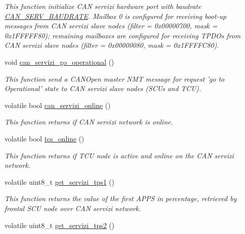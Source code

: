 \begin{DoxyCompactItemize}
\begin{DoxyCompactList}\small\item\em This function initialize C\-A\-N servizi hardware port with baudrate \hyperlink{common_8h_a2a5e84dfc7fa972b75e7ddbc6cc52a45}{C\-A\-N\-\_\-\-S\-E\-R\-V\-\_\-\-B\-A\-U\-D\-R\-A\-T\-E}. Mailbox 0 is configured for receiving boot-\/up messages from C\-A\-N servizi slave nodes (filter = 0x00000700, mask = 0x1\-F\-F\-F\-F\-F80); remaining mailboxes are configured for receiving T\-P\-D\-Os from C\-A\-N servizi slave nodes (filter = 0x00000080, mask = 0x1\-F\-F\-F\-F\-C80). \end{DoxyCompactList}\item 
void \hyperlink{group___c_a_n__servizi__group_gad444fb6be3b439dcfbefff66e85efd94}{can\-\_\-servizi\-\_\-go\-\_\-operational} ()
\begin{DoxyCompactList}\small\item\em This function send a C\-A\-N\-Open master N\-M\-T message for request 'go to Operational' state to C\-A\-N servizi slave nodes (S\-C\-Us and T\-C\-U). \end{DoxyCompactList}\item 
volatile bool \hyperlink{group___c_a_n__servizi__group_ga43e9ef52770f760c5751d83b138c7e6b}{can\-\_\-servizi\-\_\-online} ()
\begin{DoxyCompactList}\small\item\em This function returns if C\-A\-N servizi network is online. \end{DoxyCompactList}\item 
volatile bool \hyperlink{group___c_a_n__servizi__group_ga0c5f72386ae62e3e0b6908efa2fb2b28}{tcs\-\_\-online} ()
\begin{DoxyCompactList}\small\item\em This function returns if T\-C\-U node is active and online on the C\-A\-N servizi network. \end{DoxyCompactList}\item 
volatile uint8\-\_\-t \hyperlink{group___c_a_n__servizi__group_gac899876f81f391e2daafcd8b22d2f32e}{get\-\_\-servizi\-\_\-tps1} ()
\begin{DoxyCompactList}\small\item\em This function returns the value of the first A\-P\-P\-S in percentage, retrieved by frontal S\-C\-U node over C\-A\-N servizi network. \end{DoxyCompactList}\item 
volatile uint8\-\_\-t \hyperlink{group___c_a_n__servizi__group_ga431b31efe978864b1a2db0d57a5b572a}{get\-\_\-servizi\-\_\-tps2} ()

\end{DoxyCompactItemize}
